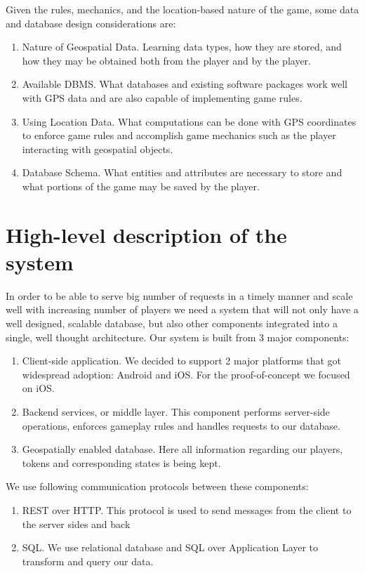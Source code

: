 \documentclass[conference]{IEEEtran}
\begin{document}
Given the rules, mechanics, and the location-based nature of the game, some data and database design considerations are:

\begin{enumerate}
	\item Nature of Geospatial Data. Learning data types, how they are stored, and how they may be obtained both from the player and by the player.
	\item Available DBMS. What databases and existing software packages work well with GPS data and are also capable of implementing game rules.
	\item Using Location Data. What computations can be done with GPS coordinates to enforce game rules and accomplish game mechanics such as the player interacting with geospatial objects.
	\item Database Schema. What entities and attributes are necessary to store and what portions of the game may be saved by the player.
\end{enumerate}
	
\section{High-level description of the system}
In order to be able to serve big number of requests in a timely manner and scale well with increasing number of players we need a system that will not only have a well designed, scalable database, but also other components integrated into a single, well thought architecture. Our system is built from 3 major components:

\begin{enumerate}
  \item Client-side application. We decided to support 2 major platforms that got widespread adoption: Android and iOS. For the proof-of-concept we focused on iOS. 
  \item Backend services, or middle layer. This component performs server-side operations, enforces gameplay rules and handles requests to our database. 
  \item Geospatially enabled database. Here all information regarding our players, tokens and corresponding states is being kept. 
\end{enumerate}

We use following communication protocols between these components:

\begin{enumerate}[label=\Alph*]
\item REST over HTTP. This protocol is used to send messages from the client to the server sides and back
\item SQL. We use relational database and SQL over Application Layer to transform and query our data. 
\end{enumerate}
\end{document}
